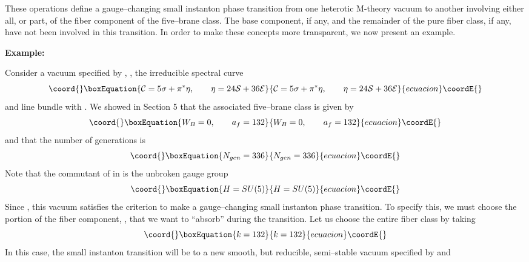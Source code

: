 \documentclass[a4paper,12pt]{article}
\numberwithin{equation}{section}
\def\cE{{\mathcal E}}
\def\cN{{\mathcal N}}
\def\cS{{\mathcal S}}
\theoremstyle{plain}
\begin{document}
These operations define a gauge--changing small instanton phase transition
from one heterotic M-theory vacuum to another involving either all, or part, of
the fiber component of the five--brane class. The base
component, if any, and the remainder of the pure fiber class, if any, 
have not been involved in this transition. In order to make these 
concepts more transparent, we now
present an example.

\bigskip

\noindent
{\bf Example:}

Consider a vacuum specified by \coordHE{}, \coordHE{}, the
irreducible spectral curve
\begin{equation}\coord{}\boxEquation{
{\cal{C}}=5\sigma + \pi^{*}\eta, \qquad \eta= 24  \cS +36\cE
\label{eq:193}
}{
{\cal{C}}=5\sigma + \pi^{*}\eta, \qquad \eta= 24  \cS +36\cE
}{ecuacion}\coordE{}\end{equation}
and line bundle \myHighlight{$\cN$}\coordHE{} with \coordHE{}. We showed in Section 5 that
the associated five--brane class is given by
\begin{equation}\coord{}\boxEquation{
W_{B}=0, \qquad a_{f}=132
\label{eq:194}
}{
W_{B}=0, \qquad a_{f}=132
}{ecuacion}\coordE{}\end{equation}
and that the number of generations is
\begin{equation}\coord{}\boxEquation{
N_{gen}=336
\label{eq:195}
}{
N_{gen}=336
}{ecuacion}\coordE{}\end{equation}
Note that the commutant of \coordHE{} in \coordHE{} is the unbroken gauge group
\begin{equation}\coord{}\boxEquation{
H=SU(5)
\label{eq:196}
}{
H=SU(5)
}{ecuacion}\coordE{}\end{equation}
Since \coordHE{}, this vacuum satisfies the criterion to make a
gauge--changing small instanton phase transition. To specify this, we must choose
the portion of the fiber component, \coordHE{}, that we want to ``absorb'' during the
transition. Let us choose the entire fiber class by taking
\begin{equation}\coord{}\boxEquation{
k=132
\label{eq:197}
}{
k=132
}{ecuacion}\coordE{}\end{equation}
In this case, the small instanton transition will be to a new smooth, but
reducible, semi--stable vacuum specified by \coordHE{} and
\end{document}
